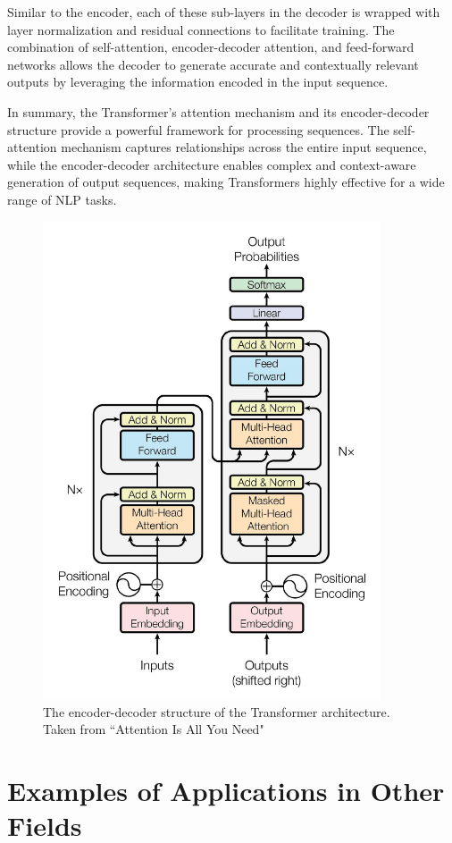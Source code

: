 Similar to the encoder, each of these sub-layers in the decoder is wrapped with layer normalization and residual connections to facilitate training. The combination of self-attention, encoder-decoder attention, and feed-forward networks allows the decoder to generate accurate and contextually relevant outputs by leveraging the information encoded in the input sequence.

In summary, the Transformer’s attention mechanism and its encoder-decoder structure provide a powerful framework for processing sequences. The self-attention mechanism captures relationships across the entire input sequence, while the encoder-decoder architecture enables complex and context-aware generation of output sequences, making Transformers highly effective for a wide range of NLP tasks.

%
\begin{figure}[htbp]
\centering
\includegraphics[width=10cm]{introduccion/figuras/Transformer_architecture.pdf}
\caption{The  encoder-decoder structure of the Transformer architecture. Taken from “Attention Is All You Need"}
\label{Transformer_architecture}
\end{figure}

\section{Examples of Applications in Other Fields}

